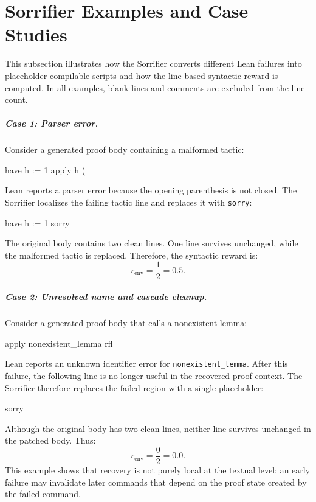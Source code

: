 \chapter{Sorrifier Examples and Case Studies}
\label{app:sorrifier-examples}

This subsection illustrates how the Sorrifier converts different Lean failures into
placeholder-compilable scripts and how the line-based syntactic reward is computed. In all examples,
blank lines and comments are excluded from the line count.

\paragraph{Case 1: Parser error.}
Consider a generated proof body containing a malformed tactic:
\begin{leanblock}
have h := 1
apply h (
\end{leanblock}
Lean reports a parser error because the opening parenthesis is not closed. The Sorrifier localizes
the failing tactic line and replaces it with \texttt{sorry}:
\begin{leanblock}
have h := 1
sorry
\end{leanblock}
The original body contains two clean lines. One line survives unchanged, while the malformed tactic is
replaced. Therefore, the syntactic reward is:
\[
r_{\text{env}} = \frac{1}{2} = 0.5.
\]

\paragraph{Case 2: Unresolved name and cascade cleanup.}
Consider a generated proof body that calls a nonexistent lemma:
\begin{leanblock}
apply nonexistent_lemma
rfl
\end{leanblock}
Lean reports an unknown identifier error for \texttt{nonexistent\_lemma}. After this failure, the following
line is no longer useful in the recovered proof context. The Sorrifier therefore replaces the failed
region with a single placeholder:
\begin{leanblock}
sorry
\end{leanblock}
Although the original body has two clean lines, neither line survives unchanged in the patched body.
Thus:
\[
r_{\text{env}} = \frac{0}{2} = 0.0.
\]
This example shows that recovery is not purely local at the textual level: an early failure may invalidate
later commands that depend on the proof state created by the failed command.

